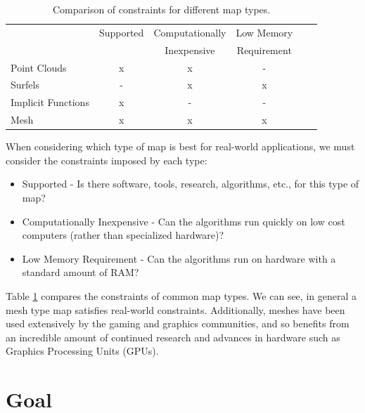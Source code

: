 \begin{table}[h]
  \caption{Comparison of constraints for different map types.}
  \label{tab:rep}
  \begin{footnotesize}
  \begin{center}
    \begin{tabular}{|l|c|c|c|c|c|}
    \hline
    \multirow{2}{*}{}   & Supported & Computationally & Low Memory  \\
                        &           & Inexpensive     & Requirement \\\hline
    Point Clouds		    & x         & x               & -           \\
    Surfels             & -         & x               & x           \\
    Implicit Functions 	& x         & -               & -           \\
    Mesh	 	            & x         & x               & x           \\
    \hline
    \end{tabular}
  \end{center}
  \end{footnotesize}
\end{table}

When considering which type of map is best for real-world applications, we must
consider the constraints imposed by each type:

\begin{itemize}
  \item Supported - Is there software, tools, research, algorithms, etc., for
  this type of map?
  \item Computationally Inexpensive - Can the algorithms run quickly on low cost
  computers (rather than specialized hardware)?
  \item Low Memory Requirement - Can the algorithms run on hardware with
  a standard amount of RAM?
\end{itemize}

Table \ref{tab:rep} compares the constraints of common map types. We can see, in
general a mesh type map satisfies real-world constraints. Additionally, meshes
have been used extensively by the gaming and graphics communities, and so
benefits from an incredible amount of continued research and advances in
hardware such as Graphics Processing Units (GPUs).

\section{Goal}

